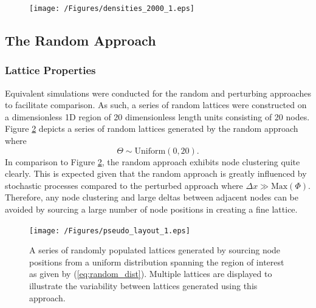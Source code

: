 \documentclass[11pt,titlepage,a4paper]{article}
\begin{document}
			\begin{figure}[tbh]
				\centering
					\texttt{[image: /Figures/densities\_2000\_1.eps]}
				\caption{}
				\label{fig:densities_2000_1}
			\end{figure}



	\subsection{The Random Approach}
		\label{sub:therandomapproach}
		
		\subsubsection{Lattice Properties}
			\label{subs:latticeproperties_random}
			
			Equivalent simulations were conducted for the random and perturbing approaches to facilitate comparison. As such, a series of random lattices were constructed on a dimensionless 1D region of 20 dimensionless length units consisting of 20 nodes. Figure \ref{fig:pseudo_layout_1} depicts a series of random lattices generated by the random approach where
			\begin{equation}
				\label{eq:random_dist}
				\Theta \sim \text{Uniform} \left(0, 20\right).	
			\end{equation}
			In comparison to Figure \ref{fig:pseudo_layout_1}, the random approach exhibits node clustering quite clearly. This is expected given that the random approach is greatly influenced by stochastic processes compared to the perturbed approach where $\Delta x \gg \text{Max} \left(\Phi \right)$. Therefore, any node clustering and large deltas between adjacent nodes can be avoided by sourcing a large number of node positions in creating a fine lattice.

			\begin{figure}[tbh]
				\centering
					\texttt{[image: /Figures/pseudo\_layout\_1.eps]}
				\caption{A series of randomly populated lattices generated by sourcing node positions from a uniform distribution spanning the region of interest as given by (\ref{eq:random_dist}). Multiple lattices are displayed to illustrate the variability between lattices generated using this approach.}
				\label{fig:pseudo_layout_1}
			\end{figure}

\end{document}
